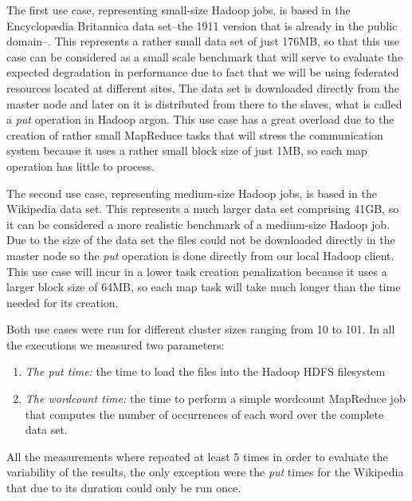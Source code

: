 The first use case, representing small-size Hadoop jobs, is based in the Encyclop{\ae}dia Britannica\cite{britannica} data set--the 1911 version that is already in the public domain--. This represents a rather small data set of just 176MB, so that this use case can be considered as a small scale benchmark that will serve to evaluate the expected degradation in performance due to fact that we will be using federated resources located at different sites. The data set is downloaded directly from the master node and later on it is distributed from there to the slaves, what is called a \emph{put} operation in Hadoop argon. This use case has a great overload due to the creation of rather small MapReduce tasks that will stress the communication system because it uses a rather small block size of just 1MB, so each map operation has little to process.

The second use case, representing medium-size Hadoop jobs, is based in the Wikipedia\cite{wikipedia} data set. This represents a much larger data set comprising 41GB, so it can be considered a more realistic benchmark of a medium-size Hadoop job. Due to the size of the data set the files could not be downloaded directly in the master node so the \emph{put} operation is done directly from our local Hadoop client. This use case will incur in a lower task creation penalization because it uses a larger block size of 64MB, so each map task will take much longer than the time needed for its creation.

 
Both use cases were run for different cluster sizes ranging from 10 to 101. In all the executions we measured two parameters:
\begin{enumerate}
\item \emph{The put time:} the time to load the files into the Hadoop HDFS filesystem 
\item \emph{The wordcount time:} the time to perform a simple wordcount MapReduce job that computes the number of occurrences of each word over the complete data set. 
\end{enumerate}
All the measurements where repeated at least 5 times in order to evaluate the variability of the results, the only exception were the \emph{put} times for the Wikipedia that due to its duration could only be run once.


